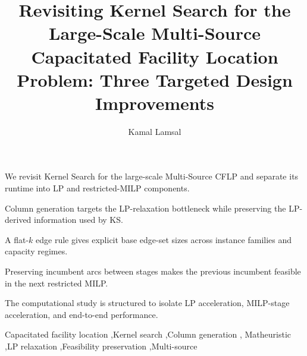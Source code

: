 \documentclass[preprint,12pt,authoryear]{elsarticle}
\begin{document}
\begin{frontmatter}

\title{Revisiting Kernel Search for the Large-Scale Multi-Source
       Capacitated Facility Location Problem:
       Three Targeted Design Improvements}

\author[jmu]{Kamal Lamsal}

\address[jmu]{Department of Computer Information Systems and Business Analytics,
              James Madison University, Harrisonburg, Virginia, USA}

\begin{highlights}
\item We revisit Kernel Search for the large-scale Multi-Source CFLP and
      separate its runtime into LP and restricted-MILP components.
\item Column generation targets the LP-relaxation bottleneck while preserving
      the LP-derived information used by KS.
\item A flat-$k$ edge rule gives explicit base edge-set sizes across instance
      families and capacity regimes.
\item Preserving incumbent arcs between stages makes the previous incumbent
      feasible in the next restricted MILP.
\item The computational study is structured to isolate LP acceleration,
      MILP-stage acceleration, and end-to-end performance.
\end{highlights}

\begin{abstract}

\end{abstract}

\begin{keyword}
Capacitated facility location \sep Kernel search \sep Column generation \sep
Matheuristic \sep LP relaxation \sep Feasibility preservation \sep Multi-source
\end{keyword}

\end{frontmatter}


\FloatBarrier

\FloatBarrier

\FloatBarrier

\FloatBarrier






\end{document}
